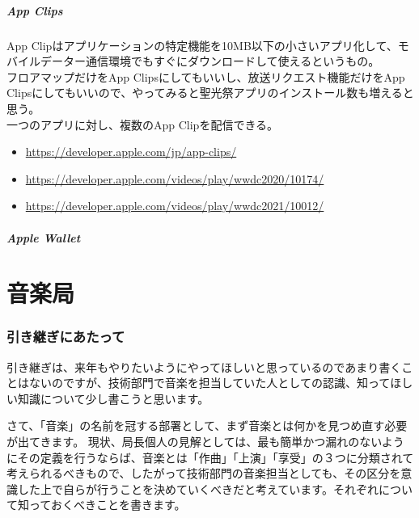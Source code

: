 \documentclass[dvipdfmx,jb5]{jarticle}
\begin{document}
  \subsubsection{App Clips}
   App Clipはアプリケーションの特定機能を10MB以下の小さいアプリ化して、モバイルデーター通信環境でもすぐにダウンロードして使えるというもの。\\
   フロアマップだけをApp Clipsにしてもいいし、放送リクエスト機能だけをApp Clipsにしてもいいので、やってみると聖光祭アプリのインストール数も増えると思う。\\
   一つのアプリに対し、複数のApp Clipを配信できる。\\
   \begin{itemize}
    \item \url{https://developer.apple.com/jp/app-clips/}
    \item \url{https://developer.apple.com/videos/play/wwdc2020/10174/}
    \item \url{https://developer.apple.com/videos/play/wwdc2021/10012/}
    \end{itemize}
  \subsubsection{Apple Wallet}

\newpage
\part{音楽局}
\section{引き継ぎにあたって}
引き継ぎは、来年もやりたいようにやってほしいと思っているのであまり書くことはないのですが、技術部門で音楽を担当していた人としての認識、知ってほしい知識について少し書こうと思います。

さて、「音楽」の名前を冠する部署として、まず音楽とは何かを見つめ直す必要が出てきます。
現状、局長個人の見解としては、最も簡単かつ漏れのないようにその定義を行うならば、音楽とは「作曲」「上演」「享受」の３つに分類されて考えられるべきもので、したがって技術部門の音楽担当としても、その区分を意識した上で自らが行うことを決めていくべきだと考えています。それぞれについて知っておくべきことを書きます。
\end{document}
